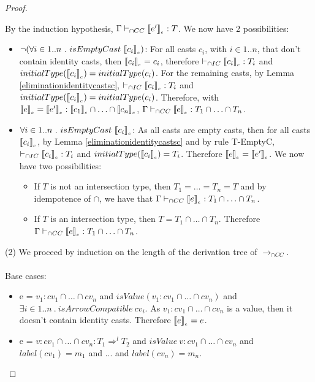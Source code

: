 \documentclass[a4paper]{article}
\begin{document}
\begin{proof}
\begin{itemize}
    By the induction hypothesis, $\Gamma \vdash_{\cap CC} \llbracket e' \rrbracket_{_e} : T$.
    We now have 2 possibilities:
    \begin{itemize}
        \item $\neg(\forall i \in 1..n\ .\ isEmptyCast\ \erasec{c_i})$:
        For all casts $c_i$, with $i \in 1..n$, that don't contain identity casts, then $\llbracket c_i \rrbracket_{_c} = c_i$, therefore $\vdash_{\cap IC} \llbracket c_i \rrbracket_{_c} : T_i$ and $initialType(\llbracket c_i \rrbracket_{_c}) = initialType(c_i)$.
        For the remaining casts, by Lemma \ref{eliminationidentitycastsc}, $\vdash_{\cap IC} \llbracket c_i \rrbracket_{_c} : T_i$ and $initialType(\llbracket c_i \rrbracket_{_c}) = initialType(c_i)$.
        Therefore, with $\llbracket e \rrbracket_{_e} = \llbracket e' \rrbracket_{_e} : \llbracket c_1 \rrbracket_{_c} \cap \ldots \cap \llbracket c_n \rrbracket_{_c}$, $\Gamma \vdash_{\cap CC} \llbracket e \rrbracket_{_e} : T_1 \cap \ldots \cap T_n$.
        \item $\forall i \in 1..n\ .\ isEmptyCast\ \erasec{c_i}$:
        As all casts are empty casts, then for all casts $\llbracket c_i \rrbracket_{_c}$, by Lemma \ref{eliminationidentitycastsc} and by rule T-EmptyC, $\vdash_{\cap IC} \llbracket c_i \rrbracket_{_c} : T_i$ and $initialType(\llbracket c_i \rrbracket_{_c}) = T_i$.
        Therefore $\llbracket e \rrbracket_{_e} = \llbracket e' \rrbracket_{_e}$.
        We now have two possibilities:
        \begin{itemize}
            \item If $T$ is not an intersection type, then $T_1 = \ldots = T_n = T$ and by idempotence of $\cap$, we have that $\Gamma \vdash_{\cap CC} \llbracket e \rrbracket_{_e} : T_1 \cap \ldots \cap T_n$.
            \item If $T$ is an intersection type, then $T = T_1 \cap \ldots \cap T_n$. Therefore $\Gamma \vdash_{\cap CC} \llbracket e \rrbracket_{_e} : T_1 \cap \ldots \cap T_n$.
        \end{itemize}
    \end{itemize}
\end{itemize}
(2) We proceed by induction on the length of the derivation tree of $\longrightarrow_{\cap CC}$.\\\\
Base cases:
\begin{itemize}
    \item e = $v_1 : cv_1 \cap \ldots \cap cv_n$ and $isValue(v_1 : cv_1 \cap \ldots \cap cv_n)$ and $\exists i \in 1..n\ .\ isArrowCompatible\ cv_i$.
    As $v_1 : cv_1 \cap \ldots \cap cv_n$ is a value, then it doesn't contain identity casts.
    Therefore $\llbracket e \rrbracket_{_e} = e$.
    \item e = $v : cv_1 \cap \ldots \cap cv_n : T_1 \Rightarrow^l T_2$ and $isValue\ v : cv_1 \cap \ldots \cap cv_n$ and $label(cv_1) = m_1$ and ... and $label(cv_n) = m_n$.

\end{itemize}
\end{proof}
\end{document}
